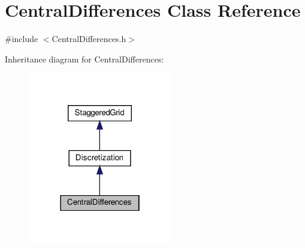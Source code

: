 \hypertarget{classCentralDifferences}{}\section{Central\+Differences Class Reference}
\label{classCentralDifferences}


{\ttfamily \#include $<$Central\+Differences.\+h$>$}



Inheritance diagram for Central\+Differences\+:\nopagebreak
\begin{figure}[H]
\begin{center}
\leavevmode
\includegraphics[width=178pt]{classCentralDifferences__inherit__graph}
\end{center}
\end{figure}


